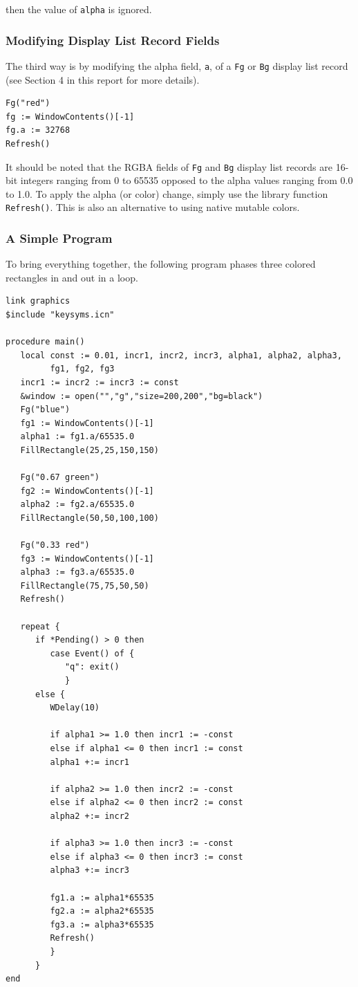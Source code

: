 \documentclass[letterpaper,12pt]{article}
\begin{document}
\noindent
then the value of \texttt{alpha} is ignored.

\subsubsection{Modifying Display List Record Fields}

The third way is by modifying the alpha field, 
\texttt{a}, of a \texttt{Fg} or \texttt{Bg} display list record 
(see Section 4 in this report for more details).

\begin{verbatim}
Fg("red")
fg := WindowContents()[-1]
fg.a := 32768
Refresh()
\end{verbatim}

\noindent
It should be noted that the RGBA fields of \texttt{Fg} and \texttt{Bg} display 
list records are 16-bit integers ranging from 0 to 65535 opposed to the alpha 
values ranging from 0.0 to 1.0. To apply the alpha (or color) change, simply
use the library function \texttt{Refresh()}. This is also an alternative to 
using native mutable colors.

\subsubsection{A Simple Program}

To bring everything together, the following program phases three colored
rectangles in and out in a loop.

\begin{verbatim}
link graphics
$include "keysyms.icn"

procedure main()
   local const := 0.01, incr1, incr2, incr3, alpha1, alpha2, alpha3,
         fg1, fg2, fg3
   incr1 := incr2 := incr3 := const
   &window := open("","g","size=200,200","bg=black")
   Fg("blue")
   fg1 := WindowContents()[-1]
   alpha1 := fg1.a/65535.0
   FillRectangle(25,25,150,150)

   Fg("0.67 green")
   fg2 := WindowContents()[-1]
   alpha2 := fg2.a/65535.0
   FillRectangle(50,50,100,100)

   Fg("0.33 red")
   fg3 := WindowContents()[-1]
   alpha3 := fg3.a/65535.0
   FillRectangle(75,75,50,50)
   Refresh()

   repeat {
      if *Pending() > 0 then
         case Event() of {
            "q": exit()
            }
      else {
         WDelay(10)

         if alpha1 >= 1.0 then incr1 := -const
         else if alpha1 <= 0 then incr1 := const
         alpha1 +:= incr1

         if alpha2 >= 1.0 then incr2 := -const
         else if alpha2 <= 0 then incr2 := const
         alpha2 +:= incr2

         if alpha3 >= 1.0 then incr3 := -const
         else if alpha3 <= 0 then incr3 := const
         alpha3 +:= incr3

         fg1.a := alpha1*65535
         fg2.a := alpha2*65535
         fg3.a := alpha3*65535
         Refresh()
         }
      }
end
\end{verbatim}
\end{document}
